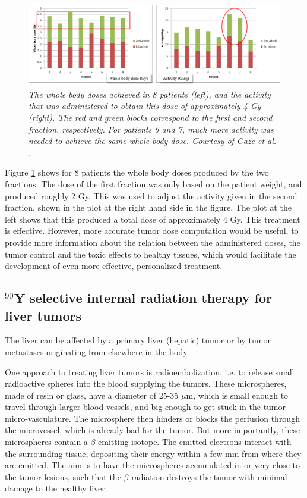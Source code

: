 \documentclass[11pt,oneside]{book}
\begin{document}
\begin{figure}[tb]
\centering
\includegraphics[width=\textwidth]{figs/fig_mIBG.png}
\caption{\label{fig:mibg} \emph{The whole body doses achieved in 8
    patients (left), and the activity that was administered to obtain
    this dose of approximately 4 Gy (right). The red and green blocks
    correspond to the first and second fraction, respectively. For
    patients 6 and 7, much more activity was needed to achieve the
    same whole body dose. Courtesy of Gaze et al. \cite{Sangro2012}.}}
\end{figure}
%
Figure \ref{fig:mibg} shows for 8 patients the whole body doses
produced by the two fractions. The dose of the first fraction was only
based on the patient weight, and produced roughly 2 Gy. This was used
to adjust the activity given in the second fraction, shown in the plot at
the right hand side in the figure. The plot at the left shows that
this produced a total dose of approximately 4 Gy. This treatment is
effective. However, more accurate tumor dose computation would be
useful, to provide more information about the relation between the
administered doses, the tumor control and the toxic effects to healthy
tissues, which would facilitate the development of even more effective,
personalized treatment.


\subsection{$^{90}$Y selective internal radiation therapy for liver tumors}
The liver can be affected by a primary liver (hepatic) tumor or by
tumor metastases originating from elsewhere in the body.

One approach to treating liver tumors is radioembolization, i.e. to
release small radioactive spheres into the blood supplying the
tumors. These microspheres, made of resin or glass, have a diameter of
25-35 $\mu$m, which is small enough to travel through larger blood
vessels, and big enough to get stuck in the tumor
micro-vasculature. The microsphere then hinders or blocks the
perfusion through the microvessel, which is already bad for the
tumor. But more importantly, these microspheres contain a
$\beta$-emitting isotope. The emitted electrons interact with the
surrounding tissue, depositing their energy within a few mm from where
they are emitted. The aim is to have the microspheres accumulated in
or very close to the tumor lesions, such that the $\beta$-radiation
destroys the tumor with minimal damage to the healthy liver.
\end{document}
